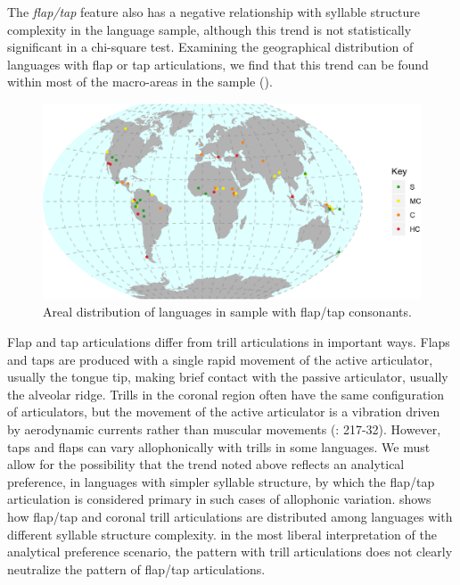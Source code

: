   The \textit{flap/tap} feature also has a negative relationship with syllable structure complexity in the language sample, although this trend is not statistically significant in a chi-square test. Examining the geographical distribution of languages with flap or tap articulations, we find that this trend can be found within most of the macro-areas in the sample ().


\begin{figure}  
\includegraphics[width=\textwidth]{figures/fig416.png}
\caption{\label{fig:4.16}Areal distribution of languages in sample with flap/tap consonants.}
\end{figure}

  Flap and tap articulations differ from trill articulations in important ways. Flaps and taps are produced with a single rapid movement of the active articulator, usually the tongue tip, making brief contact with the passive articulator, usually the alveolar ridge. Trills in the coronal region often have the same configuration of articulators, but the movement of the active articulator is a vibration driven by aerodynamic currents rather than muscular movements (\citealt{LadefogedMaddieson1996}: 217-32). However, taps and flaps can vary allophonically with trills in some languages. We must allow for the possibility that the trend noted above reflects an analytical preference, in languages with simpler syllable structure, by which the flap/tap articulation is considered primary in such cases of allophonic variation.  shows how flap/tap and coronal trill articulations are distributed among languages with different syllable structure complexity.  in the most liberal interpretation of the analytical preference scenario, the pattern with trill articulations does not clearly neutralize the pattern of flap/tap articulations.

